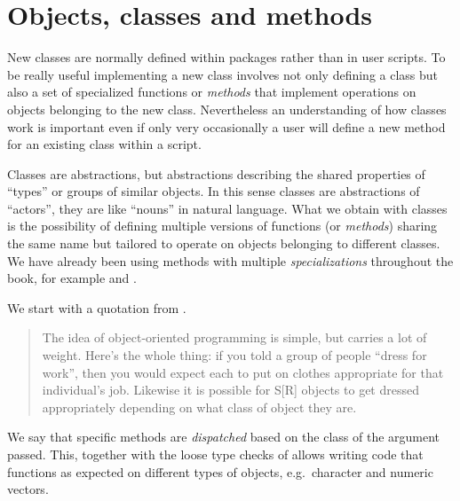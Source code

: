 \documentclass[krantz2]{krantz}\usepackage{knitr}%
\begin{document}
\section{Objects, classes and methods}\label{sec:script:objects:classes:methods}\label{sec:methods}
New classes are normally defined within packages rather than in user scripts. To be really useful implementing a new class involves not only defining a class but also a set of specialized functions or \emph{methods} that implement operations on objects belonging to the new class. Nevertheless an understanding of how classes work is important even if only very occasionally a user will define a new method for an existing class within a script.

Classes are abstractions, but abstractions describing the shared properties of ``types'' or groups of similar objects. In this sense classes are abstractions of ``actors'', they are like ``nouns'' in natural language. What we obtain with classes is the possibility of defining multiple versions of functions (or \emph{methods}) sharing the same name but tailored to operate on objects belonging to different classes. We have already been using methods with multiple \emph{specializations} throughout the book, for example  and .

We start with a quotation from  \autocite[][, page 13]{Burns1998}.
\begin{quotation}
The idea of object-oriented programming is simple, but carries a lot of weight.
Here's the whole thing: if you told a group of people ``dress for work'', then
you would expect each to put on clothes appropriate for that individual's job.
Likewise it is possible for S[R] objects to get dressed appropriately depending on
what class of object they are.
\end{quotation}

We say that specific methods are \emph{dispatched} based on the class of the argument passed. This, together with the loose type checks of \Rlang allows writing code that functions as expected on different types of objects, e.g.\ character and numeric vectors.
\end{document}
